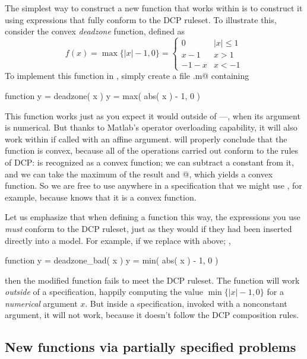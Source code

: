 \documentclass[12pt]{article}
\begin{document}
The simplest way to construct a new function that works within \cvx
is to construct it using expressions that fully conform to the DCP
ruleset.
To illustrate this, consider the convex \emph{deadzone} function,
defined as
\[
f(x) = \max \{ |x|-1, 0 \} =
\left\{ \begin{array}{ll}
0 & |x| \leq 1\\
x-1 & x > 1\\
-1-x & x <-1
\end{array}\right.
\]
To implement this function in \cvx, simply create a file \verb@deadzone.m@
containing
\begin{code}
	function y = deadzone( x )
	y = max( abs( x ) - 1, 0 )
\end{code}
This function works just as you expect it would outside of \cvx---\ie,
when its argument is numerical. But thanks to Matlab's operator
overloading capability, it will also work within \cvx if called with an affine
argument. \cvx will properly conclude that the function is convex,
because all of the operations
carried out conform to the rules of DCP:
\verb@abs@ is recognized as a convex function; we can subtract 
a constant from it, and we can take the maximum of the result and 
@, which yields a convex function. So we are free
to use \verb@deadzone@ anywhere in a \cvx specification that we might
use \verb@abs@, for example,
because \cvx knows that it is a convex function.

Let us emphasize that when defining a function this way, the
expressions you use \emph{must} conform to the DCP ruleset, just as
they would if they had been inserted directly into a \cvx model. For
example, if we replace \verb@max@ with \verb@min@ above; \eg,
\begin{code}
	function y = deadzone_bad( x )
	y = min( abs( x ) - 1, 0 )
\end{code}
then the modified function fails to meet the DCP ruleset. The
function will work \emph{outside} of a \cvx specification,
happily computing
the value $\min \{|x|-1,0\}$ for a \emph{numerical}
argument $x$. But inside a \cvx specification, invoked 
with a nonconstant argument, it will not work, because
it doesn't follow the DCP composition rules.

\subsection{New functions via partially specified problems}
\end{document}
